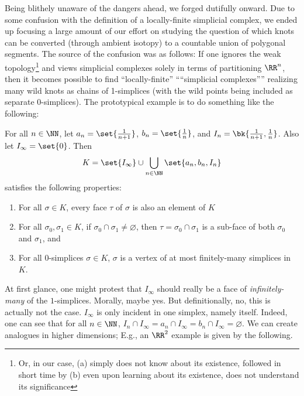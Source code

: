 Being blithely unaware of the dangers ahead, we forged dutifully
onward. Due to some confusion with the definition of a locally-finite
simplicial complex, we ended up focusing a large amount of our effort
on studying the question of which knots can be converted (through
ambient isotopy) to a countable union of polygonal segments. The
source of the confusion was as follows: If one ignores the weak
topology\footnote{Or, in our case, (a) simply does not know about its
  existence, followed in short time by (b) even upon learning about
  its existence, does not understand its significance} and views
simplicial complexes solely in terms of partitioning $\RR^n$, then it
becomes possible to find ``locally-finite'' ````simplicial
complexes'''' realizing many wild knots as chains of 1-simplices (with
the wild points being included as separate $0$-simplices). The
prototypical example is to do something like the following:
\begin{leftbar}
  For all $n \in \NN$, let $a_n = \set{\frac{1}{n+1}}$, $b_n =
  \set{\frac{1}{n}}$, and $I_n = \bk{\frac{1}{n+1}, \frac{1}{n}}$.
  Also let $I_\infty = \set{0}$. Then
  \[
    K = \set{I_\infty} \cup \bigcup_{n \in \NN} \set{a_n, b_n, I_n}
  \]
  satisfies the following properties:
  \begin{enumerate}
    \item For all $\sigma \in K$, every face $\tau$ of $\sigma$ is
      also an element of $K$
    \item For all $\sigma_0, \sigma_1 \in K$, if $\sigma_0 \cap
      \sigma_1 \neq \varnothing$, then $\tau = \sigma_0 \cap \sigma_1$
      is a sub-face of both $\sigma_0$ and $\sigma_1$, and
    \item For all $0$-simplices $\sigma \in K$, $\sigma$ is a vertex
      of at most finitely-many simplices in $K$.
  \end{enumerate}
\end{leftbar}
At first glance, one might protest that $I_\infty$ should really be a
face of \emph{infinitely-many} of the $1$-simplices. Morally, maybe
yes. But definitionally, no, this is actually not the case. $I_\infty$
is only incident in one simplex, namely itself. Indeed, one can see
that for all $n \in \NN$, $I_n \cap I_\infty = a_n \cap I_\infty = b_n
\cap I_\infty = \varnothing$. We can create analogues in higher
dimensions; E.g., an $\RR^2$ example is given by the following.
